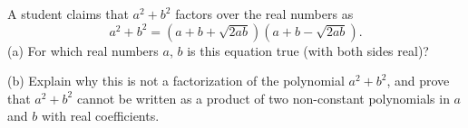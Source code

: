 A student claims that $a^2+b^2$ factors over the real numbers as
\[
a^2+b^2=\left(a+b+\sqrt{2ab}\right)\left(a+b-\sqrt{2ab}\right).
\]
(a) For which real numbers $a$, $b$ is this equation true (with both sides real)?

(b) Explain why this is not a factorization of the polynomial $a^2+b^2$, and prove that $a^2+b^2$ cannot be written as a product of two non-constant polynomials in $a$ and $b$ with real coefficients.
